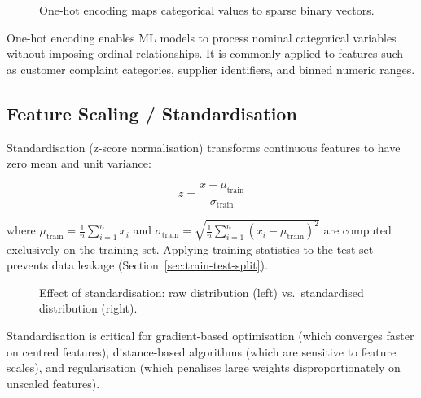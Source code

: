 \documentclass[10pt,a4paper]{article}
\begin{document}
\begin{figure}[H]
    \centering
    \caption{One-hot encoding maps categorical values to sparse binary vectors.}
    \label{fig:one-hot-encoding}
\end{figure}

One-hot encoding enables ML models to process nominal categorical variables without imposing ordinal relationships. It is commonly applied to features such as customer complaint categories, supplier identifiers, and binned numeric ranges.

\subsection{Feature Scaling / Standardisation}
\label{sec:feature-scaling}

Standardisation (z-score normalisation) transforms continuous features to have zero mean and unit variance:

\begin{equation}
z = \frac{x - \mu_{\text{train}}}{\sigma_{\text{train}}}
\label{eq:zscore}
\end{equation}

where $\mu_{\text{train}} = \frac{1}{n}\sum_{i=1}^{n} x_i$ and $\sigma_{\text{train}} = \sqrt{\frac{1}{n}\sum_{i=1}^{n}(x_i - \mu_{\text{train}})^2}$ are computed exclusively on the training set. Applying training statistics to the test set prevents data leakage (Section~\ref{sec:train-test-split}).

\begin{figure}[H]
    \centering
    \caption{Effect of standardisation: raw distribution (left) vs.\ standardised distribution (right).}
    \label{fig:feature-scaling-comparison}
\end{figure}

Standardisation is critical for gradient-based optimisation (which converges faster on centred features), distance-based algorithms (which are sensitive to feature scales), and regularisation (which penalises large weights disproportionately on unscaled features).
\end{document}
